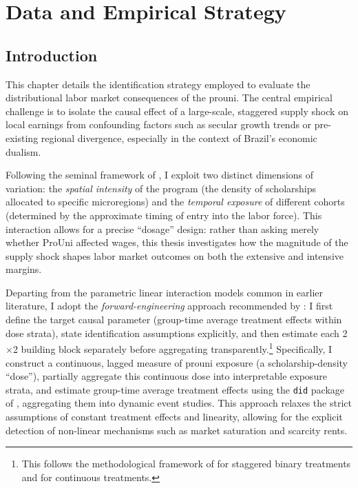 \section{Data and Empirical Strategy}
\label{sec:methodology}

\subsection{Introduction}

This chapter details the identification strategy employed to evaluate the distributional labor market consequences of the \acrfull{prouni}. The central empirical challenge is to isolate the causal effect of a large-scale, staggered supply shock on local earnings from confounding factors such as secular growth trends or pre-existing regional divergence, especially in the context of Brazil's economic dualism.

Following the seminal framework of , I exploit two distinct dimensions of variation: the \emph{spatial intensity} of the program (the density of scholarships allocated to specific microregions) and the \emph{temporal exposure} of different cohorts (determined by the approximate timing of entry into the labor force). This interaction allows for a precise ``dosage'' design: rather than asking merely whether ProUni affected wages, this thesis investigates how the magnitude of the supply shock shapes labor market outcomes on both the extensive and intensive margins.

Departing from the parametric linear interaction models common in earlier literature, I adopt the \emph{forward-engineering} approach recommended by : I first define the target causal parameter (group-time average treatment effects within dose strata), state identification assumptions explicitly, and then estimate each 2$\times$2 building block separately before aggregating transparently.\footnote{This follows the methodological framework of  for staggered binary treatments and  for continuous treatments.} Specifically, I construct a continuous, lagged measure of \acrshort{prouni} exposure (a scholarship-density ``dose''), partially aggregate this continuous dose into interpretable exposure strata, and estimate group-time average treatment effects using the \texttt{did} package of , aggregating them into dynamic event studies. This approach relaxes the strict assumptions of constant treatment effects and linearity, allowing for the explicit detection of non-linear mechanisms such as market saturation and scarcity rents.

